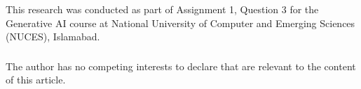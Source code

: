 \documentclass[norunningheads]{llncs}
\begin{document}
\begin{credits}
\subsubsection{\ackname}
This research was conducted as part of Assignment 1, Question 3 for the Generative AI course at National University of Computer and Emerging Sciences (NUCES), Islamabad.

\subsubsection{\discintname}
The author has no competing interests to declare that are relevant to the content of this article.
\end{credits}
\end{document}
